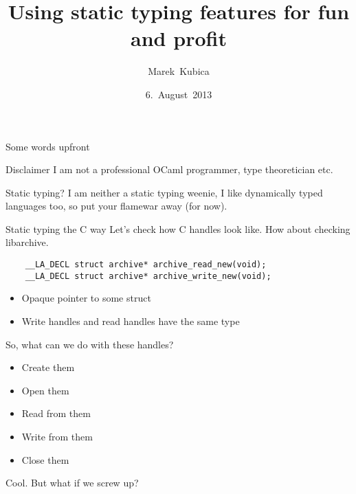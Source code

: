 \documentclass[handout]{beamer}
\title{Using static typing features for fun and profit}
\author{Marek~Kubica}
\date{6.~August~2013}
\institute{Lambda Munich}
\begin{document}



\begin{frame}{Some words upfront}
  \begin{alertblock}{Disclaimer}
    I am not a professional OCaml programmer, type theoretician etc.
  \end{alertblock}
  \pause
  \begin{alertblock}{Static typing?}
    I am neither a static typing weenie, I like dynamically typed languages
    too, so put your flamewar away (for now).
  \end{alertblock}
\end{frame}

\begin{frame}[fragile]{Static typing the C way}
  Let's check how C handles look like. How about checking libarchive.
  \begin{verbatim}
    __LA_DECL struct archive* archive_read_new(void);
    __LA_DECL struct archive* archive_write_new(void);
  \end{verbatim}
  \begin{itemize}
    \item Opaque pointer to some struct
    \item Write handles and read handles have the same type
  \end{itemize}
\end{frame}

\begin{frame}
  So, what can we do with these handles?
  \pause
  \begin{itemize}
    \item Create them
    \item Open them
    \item Read from them
    \item Write from them
    \item Close them
  \end{itemize}
  \pause
  Cool.
  \pause
  \alert{But what if we screw up?}
\end{frame}
\end{document}
